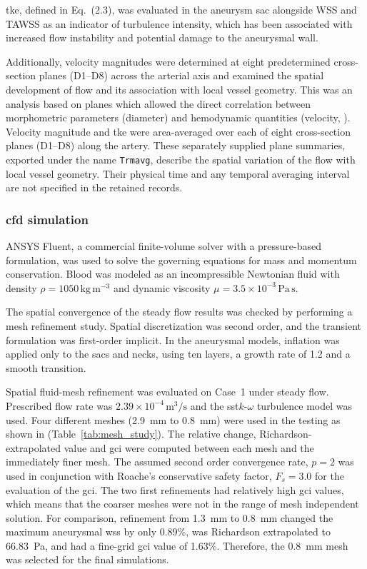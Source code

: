 \documentclass[12pt,a4paper]{article}
\newcommand{\cfdrevision}[1]{#1} %
\newcommand{\WSS}{\ac{wss}\xspace}
\newcommand{\TKE}{\ac{tke}\xspace}
\newcommand{\SST}{\ac{sst}\xspace}
\newcommand{\GCI}{\ac{gci}\xspace}
\newcommand{\CFDcap}{\Ac{cfd}\xspace}
\newcommand{\TKEcap}{\Ac{tke}\xspace}
\theoremstyle{definition}
\numberwithin{equation}{section}
\providecommand{\DIFaddtex}[1]{{\protect\color{blue} \sf #1}} %
\providecommand{\DIFdeltex}[1]{{\protect\color{red} \scriptsize #1}} %
\providecommand{\DIFaddbegin}{} %
\providecommand{\DIFaddend}{} %
\providecommand{\DIFdelbegin}{} %
\providecommand{\DIFdelend}{} %
\providecommand{\DIFadd}[1]{\texorpdfstring{\DIFaddtex{#1}}{#1}} %
\providecommand{\DIFdel}[1]{\texorpdfstring{\DIFdeltex{#1}}{}} %
\newcommand{\DIFscaledelfig}{0.5}
\newlength{\DIFdelgraphicswidth} %
\newlength{\DIFdelgraphicsheight} %
\newcommand{\DIFaddincludegraphics}[2][]{{\color{blue}\fbox{\DIFOincludegraphics[#1]{#2}}}} %
\newcommand{\DIFdelincludegraphics}[2][]{%
\sbox{\DIFdelgraphicsbox}{\DIFOincludegraphics[#1]{#2}}%
\settoboxwidth{\DIFdelgraphicswidth}{\DIFdelgraphicsbox} %
\settoboxtotalheight{\DIFdelgraphicsheight}{\DIFdelgraphicsbox} %
\scalebox{\DIFscaledelfig}{%
\parbox[b]{\DIFdelgraphicswidth}{\usebox{\DIFdelgraphicsbox}\\[-\baselineskip] \rule{\DIFdelgraphicswidth}{0em}}\llap{\resizebox{\DIFdelgraphicswidth}{\DIFdelgraphicsheight}{%
\setlength{\unitlength}{\DIFdelgraphicswidth}%
\begin{picture}(1,1)%
\thicklines\linethickness{2pt} %
{\color[rgb]{1,0,0}\put(0,0){\framebox(1,1){}}}%
{\color[rgb]{1,0,0}\put(0,0){\line( 1,1){1}}}%
{\color[rgb]{1,0,0}\put(0,1){\line(1,-1){1}}}%
\end{picture}%
}\hspace*{3pt}}} %
} %
\DeclareRobustCommand{\DIFaddbegin}{\DIFOaddbegin \let\includegraphics\DIFaddincludegraphics} %
\DeclareRobustCommand{\DIFaddend}{\DIFOaddend \let\includegraphics\DIFOincludegraphics} %
\DeclareRobustCommand{\DIFdelbegin}{\DIFOdelbegin \let\includegraphics\DIFdelincludegraphics} %
\DeclareRobustCommand{\DIFdelend}{\DIFOaddend \let\includegraphics\DIFOincludegraphics} %
\begin{document}
\TKEcap, defined in Eq.~(2.3), was evaluated in the aneurysm sac alongside WSS and TAWSS as an indicator of turbulence intensity, which has been associated with increased flow instability and potential damage to the aneurysmal wall.

\DIFdelbegin \DIFdel{Additionally, velocity magnitudes were determined at eight predetermined cross-section planes (D1--D8) across the arterial axis and examined the spatial development of flow and its association with local vessel geometry. This was an analysis based on planes which allowed the direct correlation between morphometric parameters (diameter) and hemodynamic quantities (velocity, }%
\DIFdel{).
}\DIFdelend \DIFaddbegin \DIFadd{\cfdrevision{Velocity magnitude and \TKE were area-averaged over each of eight cross-section planes (D1--D8) along the artery. These separately supplied plane summaries, exported under the name \texttt{Trmavg}, describe the spatial variation of the flow with local vessel geometry. Their physical time and any temporal averaging interval are not specified in the retained records.}
}\DIFaddend 




\subsubsection{\label{CFD Simulation}\texorpdfstring{\CFDcap}{CFD} simulation}ANSYS Fluent, a commercial finite-volume solver with a pressure-based formulation, was used to solve the governing equations for mass and momentum conservation. Blood was modeled as an incompressible Newtonian fluid with density \(\rho = 1050\,\mathrm{kg\,m^{-3}}\) and dynamic viscosity \(\mu = 3.5 \times 10^{-3}\,\mathrm{Pa\,s}\).

\DIFdelbegin \DIFdel{The spatial convergence of the steady flow results was checked by performing a mesh refinement study. }\DIFdelend \DIFaddbegin \DIFadd{\cfdrevision{Spatial discretization was second order, and the transient formulation was first-order implicit. In the aneurysmal models, inflation was applied only to the sacs and necks, using ten layers, a growth rate of 1.2 and a smooth transition.}
}


\DIFadd{\cfdrevision{Spatial fluid-mesh refinement was evaluated on Case~1 under steady flow.} }\DIFaddend Prescribed flow rate was \(2.39 \times 10^{-4} \, \mathrm{m^3/s}\) and the \SST \(k\)-\(\omega\) turbulence model was used. Four different meshes (2.9~mm to 0.8~mm) were used in the testing as shown in (Table~\ref{tab:mesh_study}). The relative change, Richardson-extrapolated value and \GCI were computed between each mesh and the immediately finer mesh. The assumed second order convergence rate, $p=2$ was used in conjunction with Roache's conservative safety factor, $F_s=3.0$ for the evaluation of the \GCI. The two first refinements had relatively high \GCI values, which means that the coarser meshes were not in the range of mesh independent solution. For comparison, refinement from 1.3~mm to 0.8~mm changed the maximum aneurysmal \WSS by only 0.89\%, was Richardson extrapolated to 66.83~Pa, and had a fine-grid \GCI value of 1.63\%. Therefore, the 0.8~mm mesh was selected for the final simulations.
\end{document}
